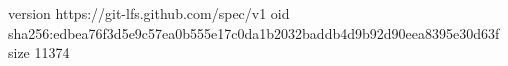 version https://git-lfs.github.com/spec/v1
oid sha256:edbea76f3d5e9c57ea0b555e17c0da1b2032baddb4d9b92d90eea8395e30d63f
size 11374
